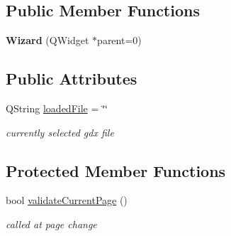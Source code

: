 \subsection*{Public Member Functions}
\begin{DoxyCompactItemize}
\item 
\hypertarget{class_wizard_a89dcfb3d0ae3eca49fd820c1e96be8f5}{}{\bfseries Wizard} (Q\+Widget $\ast$parent=0)\label{class_wizard_a89dcfb3d0ae3eca49fd820c1e96be8f5}

\end{DoxyCompactItemize}
\subsection*{Public Attributes}
\begin{DoxyCompactItemize}
\item 
\hypertarget{class_wizard_ab3f30f52640cbbd9ccb5bfd968845a72}{}Q\+String \hyperlink{class_wizard_ab3f30f52640cbbd9ccb5bfd968845a72}{loaded\+File} = \char`\"{}\char`\"{}\label{class_wizard_ab3f30f52640cbbd9ccb5bfd968845a72}

\begin{DoxyCompactList}\small\item\em currently selected gdx file \end{DoxyCompactList}\end{DoxyCompactItemize}
\subsection*{Protected Member Functions}
\begin{DoxyCompactItemize}
\item 
\hypertarget{class_wizard_ad75370785215142ccc6516c5514e26d2}{}bool \hyperlink{class_wizard_ad75370785215142ccc6516c5514e26d2}{validate\+Current\+Page} ()\label{class_wizard_ad75370785215142ccc6516c5514e26d2}

\begin{DoxyCompactList}\small\item\em called at page change \end{DoxyCompactList}\end{DoxyCompactItemize}
